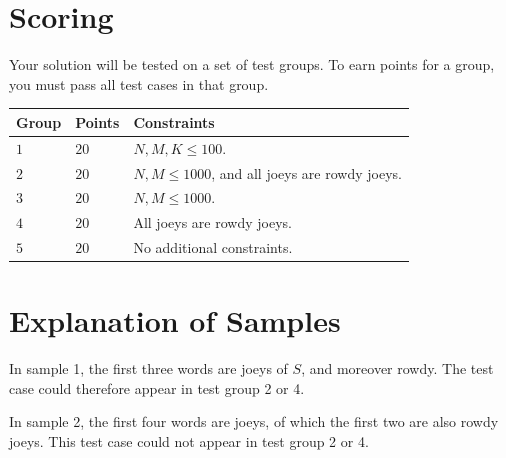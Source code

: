 \section*{Scoring}
Your solution will be tested on a set of test groups.
To earn points for a group, you must pass all test cases in that group.

\noindent
\begin{tabular}{| l | l | l |}
  \hline
  Group & Points & Constraints \\ \hline
  $1$   & $20$       & $N, M, K \le 100$. \\ \hline
  $2$   & $20$       & $N, M \le 1000$, and all joeys are rowdy joeys. \\ \hline
  $3$   & $20$       & $N, M \le 1000$. \\ \hline
  $4$   & $20$       & All joeys are rowdy joeys. \\ \hline
  $5$   & $20$       & No additional constraints. \\ \hline
\end{tabular}

\section*{Explanation of Samples}
In sample 1, the first three words are joeys of $S$, and moreover rowdy. The test case could therefore appear in test group 2 or 4.

In sample 2, the first four words are joeys, of which the first two are also rowdy joeys. This test case could not appear in test group 2 or 4.
